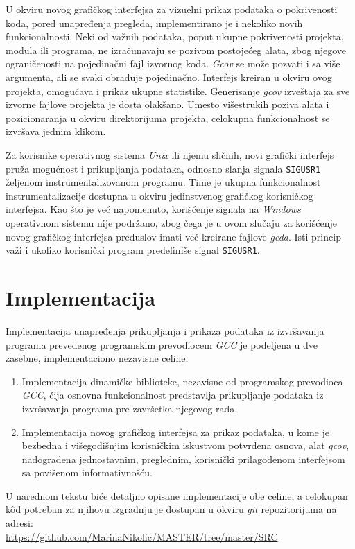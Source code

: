 \documentclass[12pt,oneside]{memoir}
\newcommand{\kod}[1]{\texttt{#1}}
\newcommand{\strano}[1]{\textit{#1}}
\begin{document}
U okviru novog grafičkog interfejsa za vizuelni prikaz podataka o pokrivenosti koda, pored unapređenja pregleda, implementirano je i nekoliko novih funkcionalnosti. Neki od važnih podataka, poput ukupne pokrivenosti projekta, modula ili programa, ne izračunavaju se pozivom postojećeg alata, zbog njegove ograničenosti na pojedinačni fajl izvornog koda. \strano{Gcov} se može pozvati i sa više argumenta, ali se svaki obrađuje pojedinačno. Interfejs kreiran u okviru ovog projekta, omogućava i prikaz ukupne statistike. Generisanje \strano{gcov} izveštaja za sve izvorne fajlove projekta je dosta olakšano. Umesto višestrukih poziva alata i pozicionaranja u okviru direktorijuma projekta, celokupna funkcionalnost se izvršava jednim klikom. 

Za korisnike operativnog sistema \strano{Unix} ili njemu sličnih, novi grafički interfejs pruža mogućnost i prikupljanja podataka, odnosno slanja signala \kod{SIGUSR1} željenom instrumentalizovanom programu. Time je ukupna funkcionalnost instrumentalizacije dostupna u okviru jedinstvenog grafičkog korisničkog interfejsa. Kao što je već napomenuto, korišćenje signala na \strano{Windows} operativnom sistemu nije podržano, zbog čega je u ovom slučaju za korišćenje novog grafičkog interfejsa preduslov imati već kreirane fajlove \strano{gcda}. Isti princip važi i ukoliko korisnički program predefiniše signal \kod{SIGUSR1}.

\chapter{Implementacija}
\label{chp:implementacija}

Implementacija unapređenja prikupljanja i prikaza podataka iz izvršavanja programa prevedenog programskim prevodiocem \strano{GCC} je podeljena u dve zasebne, implementaciono nezavisne celine:
\begin{enumerate}
\item Implementacija dinamičke biblioteke, nezavisne od programskog prevodioca \strano{GCC}, čija osnovna funkcionalnost predstavlja prikupljanje podataka iz izvršavanja programa pre završetka njegovog rada.
\item Implementacija novog grafičkog interfejsa za prikaz podataka, u kome je bezbedna i višegodišnjim korisničkim iskustvom potvrđena osnova, alat \strano{gcov}, nadograđena jednostavnim, preglednim, korisnički prilagođenom interfejsom sa povišenom informativnošću.
\end{enumerate}
U narednom tekstu biće detaljno opisane implementacije obe celine, a celokupan k\^{o}d potreban za njihovu izgradnju je dostupan u okviru \strano{git} repozitorijuma na adresi:\\
\url{https://github.com/MarinaNikolic/MASTER/tree/master/SRC}
\end{document}
